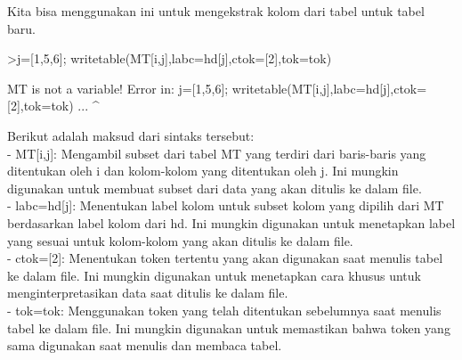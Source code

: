 \documentclass[a4paper,10pt]{article}
\begin{document}
\begin{eulernotebook}
\begin{eulercomment}
\begin{eulercomment}
\begin{eulercomment}
\begin{eulercomment}
\begin{eulercomment}
\begin{eulercomment}
\begin{eulercomment}
\begin{eulercomment}
\begin{eulercomment}
\begin{eulercomment}
\begin{eulercomment}
\begin{eulercomment}
\begin{eulercomment}
\begin{eulercomment}
\begin{eulercomment}
\begin{eulercomment}
\begin{eulercomment}
\begin{eulercomment}
\begin{eulercomment}
Kita bisa menggunakan ini untuk mengekstrak kolom dari tabel untuk
tabel baru.
\end{eulercomment}
\begin{eulerprompt}
>j=[1,5,6]; writetable(MT[i,j],labc=hd[j],ctok=[2],tok=tok)
\end{eulerprompt}
\begin{euleroutput}
  MT is not a variable!
  Error in:
  j=[1,5,6]; writetable(MT[i,j],labc=hd[j],ctok=[2],tok=tok) ...
                               ^
\end{euleroutput}
\begin{eulercomment}
Berikut adalah maksud dari sintaks tersebut:\\
- MT[i,j]: Mengambil subset dari tabel MT yang terdiri dari
baris-baris yang ditentukan oleh i dan kolom-kolom yang ditentukan
oleh j. Ini mungkin digunakan untuk membuat subset dari data yang akan
ditulis ke dalam file.\\
- labc=hd[j]: Menentukan label kolom untuk subset kolom yang dipilih
dari MT berdasarkan label kolom dari hd. Ini mungkin digunakan untuk
menetapkan label yang sesuai untuk kolom-kolom yang akan ditulis ke
dalam file.\\
- ctok=[2]: Menentukan token tertentu yang akan digunakan saat menulis
tabel ke dalam file. Ini mungkin digunakan untuk menetapkan cara
khusus untuk menginterpretasikan data saat ditulis ke dalam file.\\
- tok=tok: Menggunakan token yang telah ditentukan sebelumnya saat
menulis tabel ke dalam file. Ini mungkin digunakan untuk memastikan
bahwa token yang sama digunakan saat menulis dan membaca tabel.


\end{eulercomment}
\end{eulercomment}
\end{eulercomment}
\end{eulercomment}
\end{eulercomment}
\end{eulercomment}
\end{eulercomment}
\end{eulercomment}
\end{eulercomment}
\end{eulercomment}
\end{eulercomment}
\end{eulercomment}
\end{eulercomment}
\end{eulercomment}
\end{eulercomment}
\end{eulercomment}
\end{eulercomment}
\end{eulercomment}
\end{eulercomment}
\end{eulernotebook}
\end{document}
